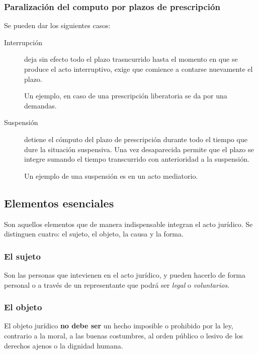 \documentclass[../main.tex]{subfiles}
\begin{document}
\subsubsection{Paralización del computo por plazos de prescripción}

Se pueden dar los siguientes casos:

\begin{description}
  \item[Interrupción] deja sin efecto todo el plazo trasncurrido hasta el momento
    en que se produce el acto interruptivo, exige que comience a contarse nuevamente
    el plazo.

    Un ejemplo, en caso de una prescripción liberatoria se da por una demandas.

  \item[Suspensión] detiene el cómputo del plazo de prescripción durante todo el
    tiempo que dure la situación suspensiva. Una vez desaparecida permite que
    el plazo se integre sumando el tiempo transcurrido con anterioridad a la 
    suspensión.
    
    Un ejemplo de una suspensión es en un acto mediatorio.
\end{description}

\subsection{Elementos esenciales}

Son aquellos elementos que de manera indispensable integran el acto jurídico. Se
distinguen cuatro: el sujeto, el objeto, la causa y la forma.

\subsubsection{El sujeto}

Son las personas que intevienen en el acto jurídico, y pueden hacerlo de forma 
personal o a través de un representante que podrá ser \textit{legal} o \textit{voluntarios}.

\subsubsection{El objeto}

El objeto jurídico \textbf{no debe ser} un hecho imposible o prohibido por la
ley, contrario a la moral, a las buenas costumbres, al orden público o lesivo 
de los derechos ajenos o la dignidad humana.
\end{document}
